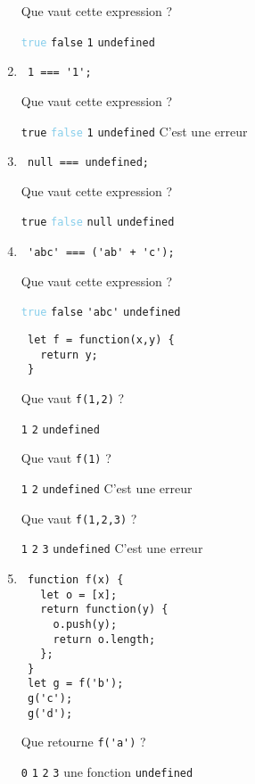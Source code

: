 \documentclass[a4paper, 12pt]{article}
\newcommand{\choice}[1]{\Square\hspace{2pt} #1\hspace{5pt}}
\newcommand{\choicec}[1]{\Square\hspace{2pt} \lstinline{#1}\hspace{5pt}}
\newcommand{\fullpoint}[1]{\textcolor{RubineRed}{#1}}
\newcommand{\halfpoint}[1]{\textcolor{SkyBlue}{#1}}
\newcommand{\choiceg}[1]{\fullpoint{\XBox\hspace{2pt} #1\hspace{5pt}}}
\newcommand{\choicecg}[1]{\fullpoint{\XBox\hspace{2pt} \lstinline{#1}\hspace{5pt}}}
\newcommand{\choicecgh}[1]{\halfpoint{\XBox\hspace{2pt} \lstinline{#1}\hspace{5pt}}}
\begin{document}
\begin{enumerate}
  Que vaut cette expression ?

  \choicecgh{true} \choicec{false} \choicec{1} \choicec{undefined}
  \newpage
\item \lstset{language=javascript}
\begin{lstlisting}
 1 === '1';
\end{lstlisting}

  Que vaut cette expression ?

  \choicec{true} \choicecgh{false} \choicec{1} \choicec{undefined} \choice{C'est une erreur}
\item \lstset{language=javascript}
\begin{lstlisting}
 null === undefined;
\end{lstlisting}

  Que vaut cette expression ?

  \choicec{true} \choicecgh{false} \choicec{null} \choicec{undefined}
\item \lstset{language=javascript}
\begin{lstlisting}
 'abc' === ('ab' + 'c');
\end{lstlisting}

  Que vaut cette expression ?

  \choicecgh{true} \choicec{false} \choicec{'abc'} \choicec{undefined}
\begin{lstlisting}
 let f = function(x,y) {
   return y;
 }
\end{lstlisting}

  Que vaut \lstinline{f(1,2)} ?

  \choicec{1} \choicecg{2} \choicec{undefined}

  Que vaut \lstinline{f(1)} ?

  \choicec{1} \choicec{2} \choicecg{undefined} \choice{C'est une erreur}

  Que vaut \lstinline{f(1,2,3)} ?

  \choicec{1} \choicecg{2} \choicec{3} \choicec{undefined} \choice{C'est une erreur}
\item \lstset{language=javascript}
\begin{lstlisting}
 function f(x) {
   let o = [x];
   return function(y) {
     o.push(y);
     return o.length;
   };
 }
 let g = f('b');
 g('c');
 g('d');
\end{lstlisting}

  Que retourne \lstinline{f('a')} ?

  \choicec{0} \choicec{1} \choicec{2} \choicec{3} \choiceg{une fonction} \choicec{undefined}


\end{enumerate}
\end{document}
